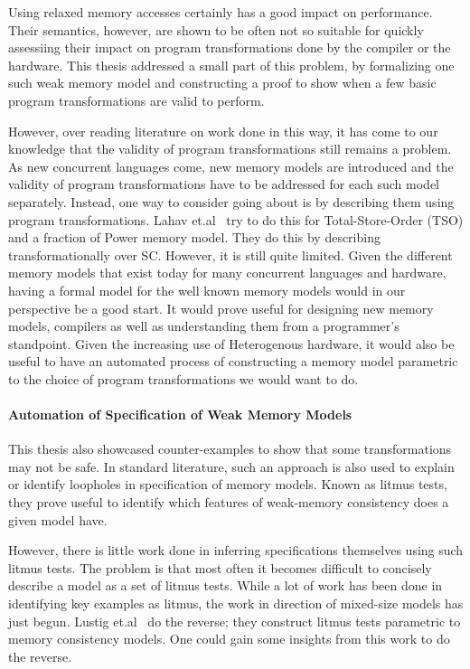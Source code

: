         Using relaxed memory accesses certainly has a good impact on performance. 
        Their semantics, however, are shown to be often not so suitable for quickly assessiing their impact on program transformations done by the compiler or the hardware. 
        This thesis addressed a small part of this problem, by formalizing one such weak memory model and constructing a proof to show when a few basic program transformations are valid to perform. 

        However, over reading literature on work done in this way, it has come to our knowledge that the validity of program transformations still remains a problem. 
        As new concurrent languages come, new memory models are introduced and the validity of program transformations have to be addressed for each such model separately. 
        Instead, one way to consider going about is by describing them using program transformations. 
        Lahav et.al~\cite{Lahav2} try to do this for Total-Store-Order (TSO) and a fraction of Power memory model. They do this by describing transformationally over SC. 
        However, it is still quite limited. 
        Given the different memory models that exist today for many concurrent languages and hardware, having a formal model for the well known memory models would in our perspective be a good start. 
        It would prove useful for designing new memory models, compilers as well as understanding them from a programmer's standpoint. 
        Given the increasing use of Heterogenous hardware, it would also be useful to have an automated process of constructing a memory model parametric to the choice of program transformations we would want to do.

    \paragraph{Automation of Specification of Weak Memory Models}

        This thesis also showcased counter-examples to show that some transformations may not be safe. 
        In standard literature, such an approach is also used to explain or identify loopholes in specification of memory models. 
        Known as litmus tests, they prove useful to identify which features of weak-memory consistency does a given model have. 

        However, there is little work done in inferring specifications themselves using such litmus tests. 
        The problem is that most often it becomes difficult to concisely describe a model as a set of litmus tests.
        While a lot of work has been done in identifying key examples as litmus, the work in direction of mixed-size models has just begun. 
        Lustig et.al~\cite{Lustig} do the reverse; they construct litmus tests parametric to memory consistency models. 
        One could gain some insights from this work to do the reverse. 
        